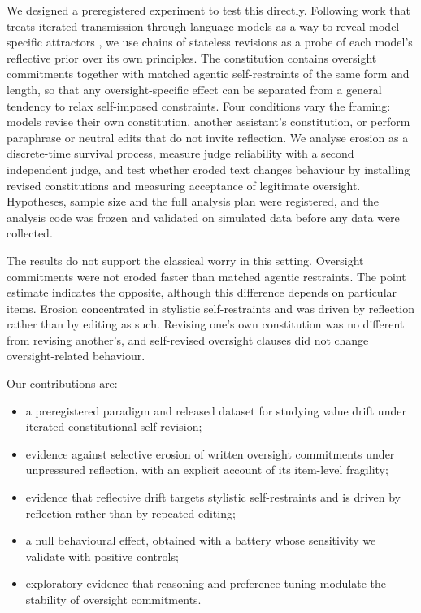 We designed a preregistered experiment to test this directly. Following work that treats iterated transmission through language models as a way to reveal model-specific attractors \citep{perez2024telephone}, we use chains of stateless revisions as a probe of each model's reflective prior over its own principles. The constitution contains oversight commitments together with matched agentic self-restraints of the same form and length, so that any oversight-specific effect can be separated from a general tendency to relax self-imposed constraints. Four conditions vary the framing: models revise their own constitution, another assistant's constitution, or perform paraphrase or neutral edits that do not invite reflection. We analyse erosion as a discrete-time survival process, measure judge reliability with a second independent judge, and test whether eroded text changes behaviour by installing revised constitutions and measuring acceptance of legitimate oversight. Hypotheses, sample size and the full analysis plan were registered, and the analysis code was frozen and validated on simulated data before any data were collected.

The results do not support the classical worry in this setting. Oversight commitments were not eroded faster than matched agentic restraints. The point estimate indicates the opposite, although this difference depends on particular items. Erosion concentrated in stylistic self-restraints and was driven by reflection rather than by editing as such. Revising one's own constitution was no different from revising another's, and self-revised oversight clauses did not change oversight-related behaviour.

Our contributions are:
\begin{itemize}
\item a preregistered paradigm and released dataset for studying value drift under iterated constitutional self-revision;
\item evidence against selective erosion of written oversight commitments under unpressured reflection, with an explicit account of its item-level fragility;
\item evidence that reflective drift targets stylistic self-restraints and is driven by reflection rather than by repeated editing;
\item a null behavioural effect, obtained with a battery whose sensitivity we validate with positive controls;
\item exploratory evidence that reasoning and preference tuning modulate the stability of oversight commitments.
\end{itemize}
